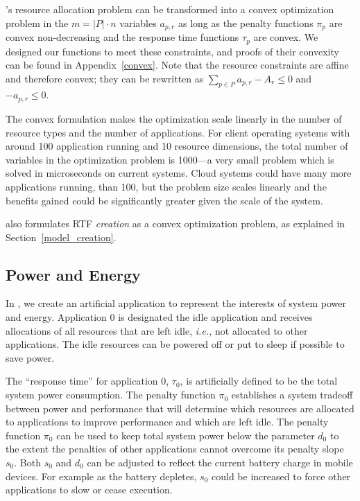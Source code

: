 \pacora's resource allocation problem can be transformed into a convex optimization problem in the $m = |P|\cdot n$ variables $a_{p,r}$ as long as the penalty functions $\pi_p$ are convex non-decreasing and the response time functions $\tau_p$ are convex.  We designed our functions to meet these constraints, and proofs of their convexity can be found in Appendix~\ref{convex}. Note that the resource constraints are affine and therefore convex; they can be rewritten as
$\sum_{p\in P} a_{p,r} - A_r \leq 0$ and $-a_{p,r} \leq 0$.

The convex formulation makes the optimization scale linearly in the number of resource types and the number of applications.   For client operating systems with around 100 application running and 10 resource dimensions, the total number of variables in the optimization problem is 1000---a very small problem which is solved in microseconds on current systems.  Cloud systems could have many more applications running,
than 100, but the problem size scales linearly and the benefits gained could be significantly greater given the scale of the system.

\pacora also formulates RTF \emph{creation} as a convex optimization problem, as explained in Section~\ref{model_creation}.

\subsection*{Power and Energy}
In \pacora, we create an artificial application to represent the interests of system power and energy.  Application 0 is designated the idle application and receives allocations of all resources
that are left idle, \emph{i.e.,} not allocated to other applications.   The idle resources can be powered off or put to sleep if possible to save power.

The ``response time'' for application 0, $\tau_0$, is artificially defined to be the total system power consumption.
The penalty function $\pi_0$ establishes a system tradeoff between power and performance that
will determine which resources are allocated to applications to improve performance and which are left idle.
The penalty function $\pi_0$ can be used to keep total system power below the parameter $d_0$
to the extent the penalties of other applications cannot overcome its penalty slope $s_0$. Both $s_0$ and $d_0$ can be adjusted to reflect the current battery charge in mobile devices. For example as the battery depletes, $s_0$ could be increased to force other applications to slow or cease execution.

